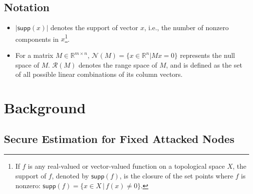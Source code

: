 \documentclass[../../thesis.tex]{subfiles}
\newcommand{\norm}[1]{\left\lVert#1\right\rVert}
\begin{document}
\subsection{Notation}
\begin{itemize}
\item 
$\lvert \textsf{supp} (x) \rvert $  denotes the support of vector $x$, i.e., the number of nonzero components in $x$\footnote{If $f$ is any real-valued or vector-valued function on a topological space $X$, the support of $f$, denoted by $\textsf{supp}(f)$, is the closure of the set points where $f$ is nonzero: $\textsf{supp}(f)  = \{ x \in X \,|\, f(x) \neq 0 \}$.}. 
\item  
For a matrix $M \in \mathbb{R}^{m \times n}$, $\mathcal{N} (M) = \{ x \in \mathbb{R}^n \lvert M x = 0 \}$ represents the null space of $M$. $\mathcal{R}(M)$ denotes the range space of $M$, and is defined as the set of all possible linear combinations of its column vectors.
\end{itemize}


\section{Background}\label{sec:overview} 

\subsection{Secure Estimation for Fixed Attacked Nodes \cite{Fawzi2014} }
\end{document}

